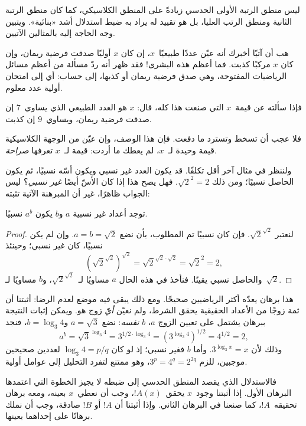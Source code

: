 \documentclass[../../../include/open-logic-section]{subfiles}
\begin{document}


ليس منطق الرتبة الأولى الحدسي زيادةً على المنطق الكلاسيكي، كما
كان منطق الرتبة الثانية ومنطق الرتب العليا، بل هو تقييد له يراد به
ضبط استدلال أشد «بنائية». ويتبين وجه الحاجة إليه بالمثالين الآتيين.

هب أن آتيًا أخبرك أنه عيّن عددًا طبيعيًا~$x$، إن كان $x$ أوليًا
صدقت فرضية ريمان، وإن كان $x$ مركبًا كذبت. فما أعظم هذه البشرى!{}
فقد ظهر أنه ردّ مسألة من أعظم مسائل الرياضيات المفتوحة، وهي صدق
فرضية ريمان أو كذبها، إلى حساب: أي إلى امتحان أولية عدد معلوم.

فإذا سألته عن قيمة~$x$ التي صنعت هذا كله، قال: $x$ هو العدد
الطبيعي الذي يساوي~$7$ إن صدقت فرضية ريمان، ويساوي~$9$ إن كذبت.

فلا عجب أن تسخط وتسترد ما دفعت. فإن هذا الوصف، وإن عيّن من الوجهة
الكلاسيكية قيمة وحيدة لـ~$x$، لم يعطك ما أردت: قيمة لـ~$x$
تعرفها \emph{صراحة}.

ولننظر في مثال آخر أقل تكلفًا. قد يكون العدد غير نسبي ويكون أسّه
نسبيًا، ثم يكون الحاصل نسبيًا؛ ومن ذلك $\sqrt{2}^2 = 2$.
فهل يصح هذا إذا كان الأسّ أيضًا \emph{غير نسبي}؟ ليس الجواب
ظاهرًا، غير أن المبرهنة الآتية تثبته:

\begin{thm}
توجد أعداد غير نسبية $a$ و$b$ يكون $a^b$ نسبيًا.
\end{thm}

\begin{proof}
لنعتبر $\sqrt{2}^{\sqrt{2}}$. فإن كان نسبيًا تم المطلوب،
بأن نضع $a = b = \sqrt{2}$. وإن لم يكن نسبيًا، كان غير نسبي؛ وحينئذ
\[
(\sqrt{2}^{\sqrt{2}})^{\sqrt{2}} = \sqrt{2}^{\sqrt{2} \cdot
  \sqrt{2}} = \sqrt{2}^2 = 2,
\]
والحاصل نسبي يقينًا. فنأخذ في هذه الحال $a$ مساويًا
لـ~$\sqrt{2}^{\sqrt{2}}$، و$b$ مساويًا لـ~$\sqrt 2$.
\end{proof}

هذا برهان يعدّه أكثر الرياضيين صحيحًا. ومع ذلك يبقى فيه موضع
لعدم الرضا: أثبتنا أن ثمة زوجًا من الأعداد الحقيقية يحقق الشرط،
ولم نعيّن \emph{أيّ} زوج هو. ويمكن إثبات النتيجة ببرهان يشتمل
على تعيين الزوج $a$، $b$ \emph{نفسه}: نضع $a = \sqrt{3}$
و$b = \log_3 4$، فنجد
\[
a^b = \sqrt{3}^{\log_3 4} = 3^{1/2 \cdot \log_3 4} = (3^{\log_3
  4})^{1/2} = 4^{1/2}= 2,
\]
وذلك لأن $3^{\log_3 x} = x$. وأما $b$ فغير نسبي؛ إذ لو كان
$\log_3 4=p/q$ لعددين صحيحين موجبين، للزم $3^p=4^q=2^{2q}$،
وهو ممتنع لتفرد التحليل إلى عوامل أولية.

فالاستدلال الذي يقصد المنطق الحدسي إلى ضبطه لا يجيز الخطوة التي
اعتمدها البرهان الأول. إذا أثبتنا وجود~$x$ يحقق~$!A(x)$،
وجب أن نعطي~$x$ بعينه، ومعه برهان تحقيقه~$!A$، كما صنعنا في
البرهان الثاني. وإذا أثبتنا أن $!A$ أو $!B$ صادقة، وجب أن نملك
برهانًا على إحداهما بعينها.
\end{document}
